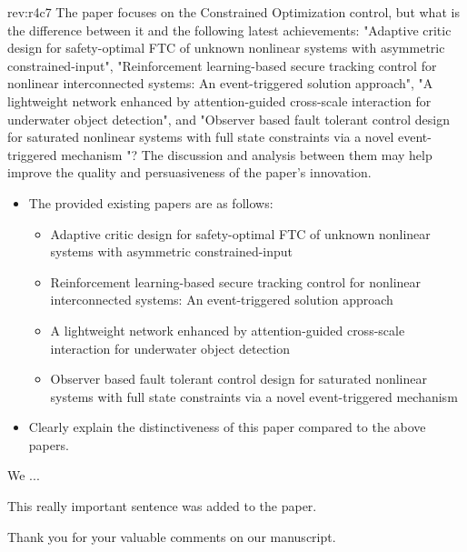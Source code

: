 \documentclass[12pt,english]{reviewresponse}
\begin{document}
\begin{revcomment}[1]{rev:r4c7}
    The paper focuses on the Constrained Optimization control, but what is the difference between it and the following latest achievements: "Adaptive critic design for safety-optimal FTC of unknown nonlinear systems with asymmetric constrained-input", "Reinforcement learning-based secure tracking control for nonlinear interconnected systems: An event-triggered solution approach", "A lightweight network enhanced by attention-guided cross-scale interaction for underwater object detection", and "Observer based fault tolerant control design for saturated nonlinear systems with full state constraints via a novel event-triggered mechanism "? The discussion and analysis between them may help improve the quality and persuasiveness of the paper's innovation.
\end{revcomment}

\begin{howtoanswer}
    \begin{itemize}
        \item The provided existing papers are as follows:
        \begin{itemize}
            \item Adaptive critic design for safety-optimal FTC of unknown nonlinear systems with asymmetric constrained-input
            \item Reinforcement learning-based secure tracking control for nonlinear interconnected systems: An event-triggered solution approach
            \item A lightweight network enhanced by attention-guided cross-scale interaction for underwater object detection
            \item Observer based fault tolerant control design for saturated nonlinear systems with full state constraints via a novel event-triggered mechanism
        \end{itemize}
        \item Clearly explain the distinctiveness of this paper compared to the above papers.
    \end{itemize}
\end{howtoanswer}

\begin{revresponse}
    We ...
    \begin{changes}
        This really important sentence was added to the paper.
    \end{changes}
\end{revresponse}

\begin{concludingresponse}[]
    Thank you for your valuable comments on our manuscript. 
\end{concludingresponse}
\end{document}
